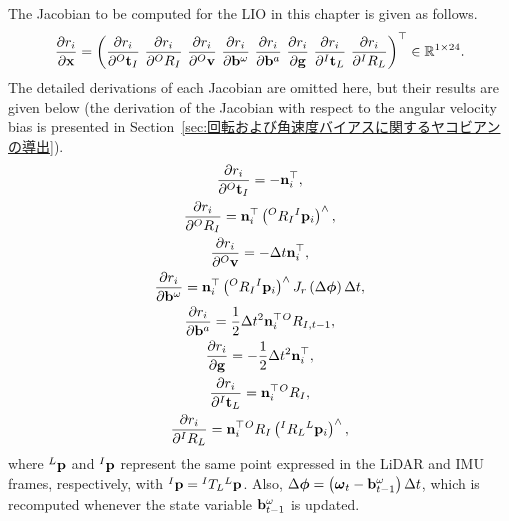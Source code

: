 The Jacobian to be computed for the LIO in this chapter is given as follows.
%
\begin{align}
  \frac{ \partial r_{i} }{ \partial {\bf x} }
  = \left(
    \frac{ \partial r_{i} }{ \partial {}^{O}{\bf t}_{I} } ~
    \frac{ \partial r_{i} }{ \partial {}^{O}R_{I} } ~
    \frac{ \partial r_{i} }{ \partial {}^{O}{\bf v} } ~
    \frac{ \partial r_{i} }{ \partial {\bf b}^{\omega} } ~
    \frac{ \partial r_{i} }{ \partial {\bf b}^{a} } ~
    \frac{ \partial r_{i} }{ \partial {\bf g} } ~
    \frac{ \partial r_{i} }{ \partial {}^{I}{\bf t}_{L} } ~
    \frac{ \partial r_{i} }{ \partial {}^{I}R_{L} }
  \right)^{\top} \in \mathbb{R}^{1 \times 24}.
  \label{eq:residual_jecobian_tight}
\end{align}
%
The detailed derivations of each Jacobian are omitted here, but their results are given below (the derivation of the Jacobian with respect to the angular velocity bias is presented in Section~\ref{sec:回転および角速度バイアスに関するヤコビアンの導出}).
%
\begin{align}
  \begin{gathered}
    \frac{ \partial r_{i} }{ \partial {}^{O}{\bf t}_{I} } = -{\bf n}_{i}^{\top}, \\
%
    \frac{ \partial r_{i} }{ \partial {}^{O}R_{I} } = {\bf n}_{i}^{\top} \left( {}^{O}R_{I} {}^{I}{\bf p}_{i} \right)^{\wedge}, \\
%
    \frac{ \partial r_{i} }{ \partial {}^{O}{\bf v} } = -\Delta t {\bf n}_{i}^{\top}, \\
%
    \frac{ \partial r_{i} }{ \partial {\bf b}^{\omega} } = {\bf n}_{i}^{\top} \left( {}^{O}R_{I} {}^{I}{\bf p}_{i} \right)^{\wedge} J_{r} \left( \Delta \boldsymbol \phi \right) \Delta t, \\
%
    \frac{ \partial r_{i} }{ \partial {\bf b}^{a} } = \frac{1}{2} \Delta t^{2} {\bf n}_{i}^{\top} {}^{O}R_{I, t-1}, \\
%
    \frac{ \partial r_{i} }{ \partial {\bf g} } = -\frac{1}{2} \Delta t^{2} {\bf n}_{i}^{\top}, \\
%
    \frac{ \partial r_{i} }{ \partial {}^{I}{\bf t}_{L} } = {\bf n}_{i}^{\top} {}^{O}R_{I}, \\
%
    \frac{ \partial r_{i} }{ \partial {}^{I}R_{L} } = {\bf n}_{i}^{\top} {}^{O}R_{I} \left( {}^{I}R_{L} {}^{L}{\bf p}_{i} \right)^{\wedge}, \\
  \end{gathered}
\end{align}
%
where ${}^{L}{\bf p}$ and ${}^{I}{\bf p}$ represent the same point expressed in the LiDAR and IMU frames, respectively, with ${}^{I}{\bf p} = {}^{I}T_{L} {}^{L}{\bf p}$.
Also, $\Delta \boldsymbol \phi = \left( \boldsymbol \omega_{t} - {\bf b}_{t-1}^{\omega} \right) \Delta t$, which is recomputed whenever the state variable ${\bf b}_{t-1}^{\omega}$ is updated.

